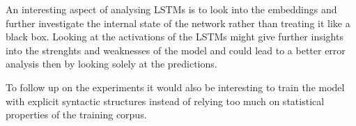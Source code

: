 \documentclass[11pt,a4paper]{article}
\begin{document}
An interesting aspect of analysing LSTMs is to look into the embeddings and further investigate the internal state of the network rather than treating it like a black box. Looking at the activations of the LSTMs might give further insights into the strenghts and weaknesses of the model and could lead to a better error analysis then by looking solely at the predictions. 

To follow up on the experiments it would also be interesting to train the model with explicit syntactic structures instead of relying too much on statistical properties of the training corpus.





%
%




\end{document}
